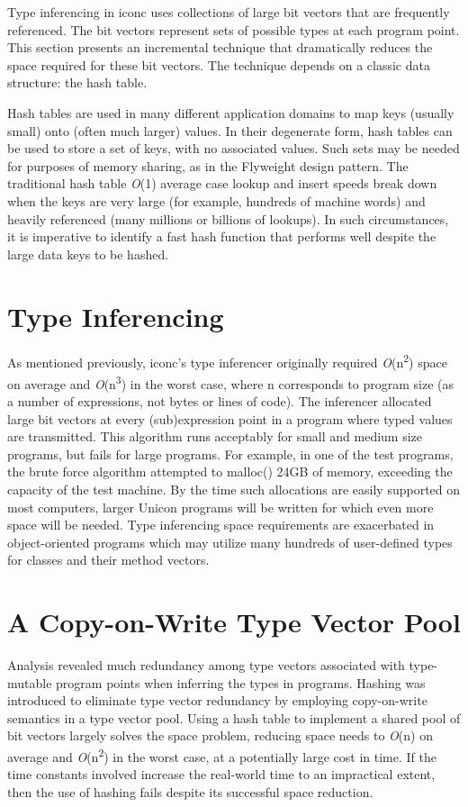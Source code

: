 Type inferencing in iconc uses collections of large bit vectors that
are frequently referenced. The bit vectors represent sets of possible
types at each program point. This section presents an incremental
technique that dramatically reduces the space required for these bit
vectors. The technique depends on a classic data structure: the hash table.

Hash tables are used in many different application domains to map keys
(usually small) onto (often much larger) values. In their degenerate
form, hash tables can be used to store a set of keys, with no
associated values. Such sets may be needed for purposes of memory
sharing, as in the Flyweight design pattern. The traditional hash
table {\textit{O}}(1) average case lookup and insert speeds break down
when the keys are very large (for example, hundreds of machine words)
and heavily referenced (many millions or billions of lookups). In such
circumstances, it is imperative to identify a fast hash function that
performs well despite the large data keys to be hashed.

\section{Type Inferencing}

As mentioned previously, iconc's type inferencer originally required
\textit{O}(n\textsuperscript{2}) space on average and
\textit{O}(n\textsuperscript{3}) in the worst case, where n
corresponds to program size (as a number of expressions, not bytes or
lines of code).  The inferencer allocated large bit vectors at every
(sub)expression point in a program where typed values are
transmitted. This algorithm runs acceptably for small and medium size
programs, but fails for large programs. For example, in one of the
test programs, the brute force algorithm attempted to
\textsf{malloc()} 24GB of memory, exceeding the capacity of the test
machine. By the time such allocations are easily supported on most
computers, larger Unicon programs will be written for which even more
space will be needed. Type inferencing
space requirements are exacerbated in object-oriented programs which
may utilize many hundreds of user-defined types for classes and their
method vectors.

\section{A Copy-on-Write Type Vector Pool}

Analysis revealed much redundancy among type vectors associated with
type-mutable program points when inferring the types in
programs. Hashing was introduced to eliminate type vector redundancy
by employing copy-on-write semantics in a type vector pool. Using a
hash table to implement a shared pool of bit vectors largely solves
the space problem, reducing space needs to \textit{O}(n) on average
and \textit{O}(n\textsuperscript{2}) in the worst case, at a
potentially large cost in time. If the time constants involved
increase the real-world time to an impractical extent, then the use of
hashing fails despite its successful space reduction.

